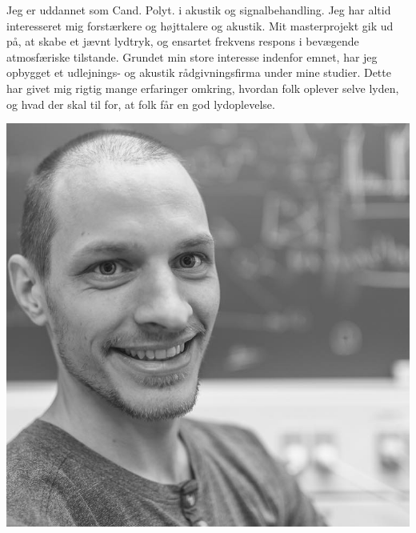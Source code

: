 \documentclass{my_cv}
\begin{document}
%
\noindent

    \vspace*{4pt}
    \vspace{10pt}
	\begin{minipage}[t]{.75\textwidth}%
    Jeg er uddannet som Cand. Polyt. i akustik og signalbehandling. Jeg har altid interesseret mig forstærkere og højttalere og akustik. Mit masterprojekt gik ud på, at skabe et jævnt lydtryk, og ensartet frekvens respons i bevægende atmosfæriske tilstande. Grundet min store interesse indenfor emnet, har jeg opbygget et udlejnings- og akustik rådgivningsfirma under mine studier. Dette har givet mig rigtig mange erfaringer omkring, hvordan folk oplever selve lyden, og hvad der skal til for, at folk får en god lydoplevelse.

\end{minipage}
\hfill%
\begin{minipage}[t][0.20\textwidth][b]{.20\textwidth}
	\includegraphics[width=\textwidth]{figures/mig.jpg}
\end{minipage}%
%
\end{document}
